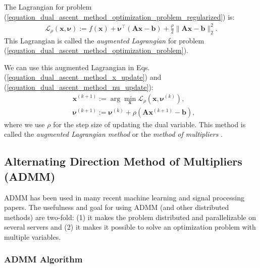 \documentclass[lang=cn,10pt]{gorgeousnbook}
\numberwithin{equation}{section}%
\numberwithin{figure}{section}%
\begin{document}
\begin{definition}
The Lagrangian for problem (\ref{equation_dual_ascent_method_optimization_problem_regularized}) is:
\begin{align}
\mathcal{L}_\rho(\boldsymbol{x}, \boldsymbol{\nu}) := f(\boldsymbol{x}) + \boldsymbol{\nu}^\top (\boldsymbol{A} \boldsymbol{x} - \boldsymbol{b}) + \frac{\rho}{2} \|\boldsymbol{A} \boldsymbol{x} - \boldsymbol{b}\|_2^2.
\end{align}
This Lagrangian is called the \textit{augmented Lagrangian} for problem (\ref{equation_dual_ascent_method_optimization_problem}). 
\end{definition}

We can use this augmented Lagrangian in Eqs. (\ref{equation_dual_ascent_method_x_update}) and (\ref{equation_dual_ascent_method_nu_update}):
\begin{align}
& \boldsymbol{x}^{(k+1)} := \arg\min_{\boldsymbol{x}} \mathcal{L}_\rho(\boldsymbol{x}, \boldsymbol{\nu}^{(k)}), \label{equation_methodOfMultipliers_x_update} \\
& \boldsymbol{\nu}^{(k+1)} := \boldsymbol{\nu}^{(k)} + \rho (\boldsymbol{A} \boldsymbol{x}^{(k+1)} - \boldsymbol{b}), \label{equation_methodOfMultipliers_nu_update}
\end{align}
where we use $\rho$ for the step size of updating the dual variable. 
This method is called the \textit{augmented Lagrangian method} or the \textit{method of multipliers} \cite{hestenes1969multiplier,powell1969method,bertsekas1982method}. 

\subsection{Alternating Direction Method of Multipliers (ADMM)}

ADMM \cite{gabay1976dual,glowinski1976finite,boyd2011distributed} has been used in many recent machine learning and signal processing papers. The usefulness and goal for using ADMM (and other distributed methods) are two-fold: (1) it makes the problem distributed and parallelizable on several servers and (2) it makes it possible to solve an optimization problem with multiple variables. 

\subsubsection{ADMM Algorithm}
\end{document}
